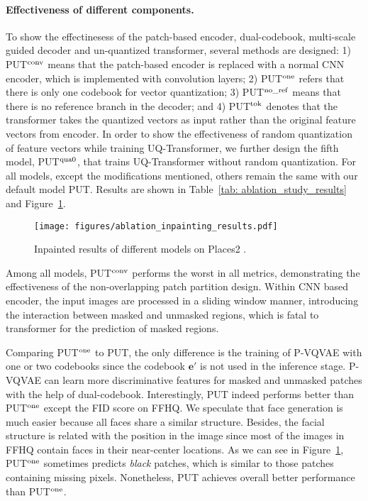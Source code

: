 \documentclass[10pt,twocolumn,letterpaper]{article}
\newcommand{\Tref}[1]{Table~\ref{#1}}
\newcommand{\Fref}[1]{Figure~\ref{#1}}
\begin{document}
\paragraph{Effectiveness of different components.}
To show the effectinesess of the patch-based encoder, dual-codebook, multi-scale guided decoder and un-quantized transformer,
several methods are designed: 1) PUT$^{\rm conv}$ means that the patch-based encoder is replaced with a normal CNN encoder, which is implemented with convolution layers; 2) PUT$^{\rm one}$ refers that there is only one codebook for vector quantization; 3) PUT$^{{\rm no\_ref}}$ means that there is no reference branch in the decoder; and 4) PUT$^{\rm tok}$ denotes that the transformer takes the quantized vectors as input rather than the original feature vectors from encoder.
In order to show the effectiveness of random quantization of feature vectors while training UQ-Transformer, we further design the fifth model, PUT$^{\rm qua0}$, that trains UQ-Transformer without random quantization. For all models, except the modifications mentioned, others remain the same with our default model PUT. Results are shown in \Tref{tab: ablation_study_results} and \Fref{figure: ablation_inpainting_results}.


\begin{figure}[t]
	\centering
	\texttt{[image: figures/ablation\_inpainting\_results.pdf]} 
	\vspace{-15pt}
	\caption{Inpainted results of different models on Places2 \cite{zhou2017places}.}
	\vspace{-10pt}
	\label{figure: ablation_inpainting_results}
\end{figure}



Among all models, PUT$^{\rm conv}$ performs the worst in all metrics, demonstrating the effectiveness of the non-overlapping patch partition design. Within CNN based encoder, the input images are processed in a sliding window manner, introducing the interaction between masked and unmasked regions, which is fatal to transformer for the prediction of masked regions. 

Comparing PUT$^{\rm one}$ to PUT, the only difference is the training of P-VQVAE with one or two codebooks since the codebook $\mathbf{e'}$ is not used in the inference stage. P-VQVAE can learn more discriminative features for masked and unmasked patches with the help of dual-codebook. Interestingly, PUT indeed performs better than PUT$^{\rm one}$ except the FID score on FFHQ. We speculate that face generation is much easier because all faces share a similar structure. Besides, the facial structure is related with the position in the image since most of the images in FFHQ contain faces in their near-center locations. As we can see in \Fref{figure: ablation_inpainting_results}, PUT$^{\rm one}$ sometimes predicts \emph{black} patches, which is similar to those patches containing missing pixels. Nonetheless, PUT achieves overall better performance than PUT$^{\rm one}$.
\end{document}
